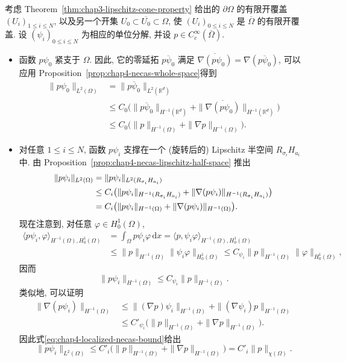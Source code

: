 \begin{Proof}
考虑 Theorem~\ref{thm:chap3-lipschitz-cone-property} 给出的 $\partial\Omega$ 的有限开覆盖 $(U_i)_{1\leq i\leq N}$, 以及另一个开集 $U_0\subset\overline{U_0}\subset\Omega$, 使 $(U_i)_{0\leq i\leq N}$ 是 $\overline\Omega$ 的有限开覆盖. 设 $(\psi_i)_{0\leq i\leq N}$ 为相应的单位分解, 并设 $p\in C_c^\infty(\overline\Omega)$.

\begin{itemize}
 \item 函数 $p\psi_0$ 紧支于 $\Omega$. 因此, 它的零延拓 $\overline{p\psi_0}$ 满足 $\overline{\nabla(p\psi_0)}=\nabla(\overline{p\psi_0})$, 可以应用 Proposition~\ref{prop:chap4-necas-whole-space}得到
 \[
 \begin{aligned}
  \|p\psi_0\|_{L^2(\Omega)}
  &=\|\overline{p\psi_0}\|_{L^2(\mathbb R^d)}\\
  &\leq C_0\bigl(\|\overline{p\psi_0}\|_{H^{-1}(\mathbb R^d)}
  +\|\overline{\nabla(p\psi_0)}\|_{H^{-1}(\mathbb R^d)}\bigr)\\
  &\leq C_0\bigl(\|p\|_{H^{-1}(\Omega)}+\|\nabla p\|_{H^{-1}(\Omega)}\bigr).
 \end{aligned}
 \]

 \item 对任意 $1\leq i\leq N$, 函数 $p\psi_i$ 支撑在一个 (旋转后的) Lipschitz 半空间 $R_{\sigma_i}H_{a_i}$ 中. 由 Proposition~\ref{prop:chap4-necas-lipschitz-half-space} 推出
 \begin{align}
  \|p\psi_i\|_{L^2(\Omega)}
  &=\|p\psi_i\|_{L^2(R_{\sigma_i}H_{a_i})}\notag\\
  &\leq C_i\bigl(\|p\psi_i\|_{H^{-1}(R_{\sigma_i}H_{a_i})}
  +\|\nabla(p\psi_i)\|_{H^{-1}(R_{\sigma_i}H_{a_i})}\bigr)\notag\\
  &=C_i\bigl(\|p\psi_i\|_{H^{-1}(\Omega)}
  +\|\nabla(p\psi_i)\|_{H^{-1}(\Omega)}\bigr).
  \label{eq:chap4-localized-necas-bound}
 \end{align}
 现在注意到, 对任意 $\varphi\in H_0^1(\Omega)$,
 \[
 \begin{aligned}
  \langle p\psi_i,\varphi\rangle_{H^{-1}(\Omega),H_0^1(\Omega)}
  &=\int_\Omega p\psi_i\varphi\,\mathrm dx
  =\langle p,\psi_i\varphi\rangle_{H^{-1}(\Omega),H_0^1(\Omega)}\\
  &\leq\|p\|_{H^{-1}(\Omega)}\|\psi_i\varphi\|_{H_0^1(\Omega)}
  \leq C_{\psi_i}\|p\|_{H^{-1}(\Omega)}\|\varphi\|_{H_0^1(\Omega)},
 \end{aligned}
 \]
 因而
 \[
  \|p\psi_i\|_{H^{-1}(\Omega)}
  \leq C_{\psi_i}\|p\|_{H^{-1}(\Omega)}.
 \]
 类似地, 可以证明
 \[
 \begin{aligned}
  \|\nabla(p\psi_i)\|_{H^{-1}(\Omega)}
  &\leq\|(\nabla p)\psi_i\|_{H^{-1}(\Omega)}
  +\|(\nabla\psi_i)p\|_{H^{-1}(\Omega)}\\
  &\leq C'_{\psi_i}\bigl(\|p\|_{H^{-1}(\Omega)}
  +\|\nabla p\|_{H^{-1}(\Omega)}\bigr).
 \end{aligned}
 \]
 因此式\eqref{eq:chap4-localized-necas-bound}给出
 \[
  \|p\psi_i\|_{L^2(\Omega)}
  \leq C'_i\bigl(\|p\|_{H^{-1}(\Omega)}+\|\nabla p\|_{H^{-1}(\Omega)}\bigr)
  =C'_i\|p\|_{\chi(\Omega)}.
 \]
\end{itemize}


\end{Proof}
